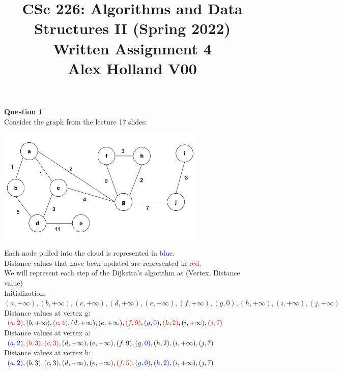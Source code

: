 \documentclass{article}
\title{%
   CSc 226: Algorithms and Data Structures II (Spring 2022) \\
   \large Written Assignment 4\\
    Alex Holland V00}
\date{}
\begin{document}
\maketitle

{\bf Question 1}\\

Consider the graph from the lecture 17 slides:
\begin{center}
    \includegraphics[width=0.75\textwidth]{1.png}
\end{center}

Each node pulled into the cloud is represented in \textcolor{blue}{blue}.\\
Distance values that have been updated are represented in \textcolor{red}{red}.\\
We will represent each step of the Dijkstra's algorithm as (Vertex, Distance value)\\

\smallskip
Initialization:\\
$(a, + \infty), (b, + \infty), (c, + \infty), (d, + \infty), (e, + \infty), (f, + \infty), (g, 0), (h, + \infty), (i, + \infty), (j, + \infty)$\\

Distance values at vertex g:\\
$\textcolor{red}{(a, 2)}, (b, + \infty), \textcolor{red}{(c, 4)}, (d, + \infty), (e, + \infty), \textcolor{red}{(f, 9)}, \textcolor{blue}{(g, 0)}, \textcolor{red}{(h, 2)}, (i, + \infty), \textcolor{red}{(j, 7)}$\\

Distance values at vertex a:\\
$\textcolor{blue}{(a, 2)}, \textcolor{red}{(b, 3)}, \textcolor{red}{(c, 3)}, (d, + \infty), (e, + \infty), (f, 9), \textcolor{blue}{(g, 0)}, (h, 2), (i, + \infty), (j, 7)$\\

Distance values at vertex h:\\
$\textcolor{blue}{(a, 2)}, (b, 3), (c, 3), (d, + \infty), (e, + \infty), \textcolor{red}{(f, 5)}, \textcolor{blue}{(g, 0)}, \textcolor{blue}{(h, 2)}, (i, + \infty), (j, 7)$\\
\end{document}
